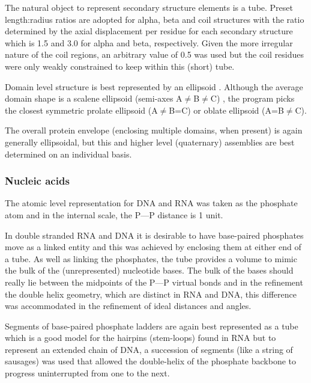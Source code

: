 The natural object to represent secondary structure elements is a tube.   Preset
length:radius ratios are adopted for alpha, beta and coil structures with the ratio
determined by the axial displacement per residue for each secondary structure which
is 1.5 and 3.0 for alpha and beta, respectively.   Given the more irregular nature
of the coil regions, an arbitrary value of 0.5 was used but the coil residues were
only weakly constrained to keep within this (short) tube.

Domain level structure is best represented by an ellipsoid \cite{TaylorWRet83b}.  
Although the average domain shape is a scalene ellipsoid (semi-axes A$\ne$B$\ne$C)
\cite{AszodiAet94a}, the program picks
the closest symmetric prolate ellipsoid (A$\ne$B=C) or oblate ellipsoid (A=B$\ne$C).

The overall protein envelope (enclosing multiple domains, when present) is again generally
ellipsoidal, but this and higher level (quaternary) assemblies are best determined on an individual basis.

\subsubsection{Nucleic acids}

The atomic level representation for DNA and RNA was taken as the phosphate atom
and in the internal scale, the P---P distance is 1 unit.

In double stranded RNA and DNA it is desirable to have base-paired phosphates
move as a linked entity and this was achieved by enclosing them at either end of
a tube.  As well as linking the phosphates, the tube provides a volume to mimic
the bulk of the (unrepresented) nucleotide bases.   The bulk of the bases should
really lie between the midpoints of the P---P virtual bonds and in the refinement the
double helix geometry, which are distinct in RNA and DNA, this difference
was accommodated in the refinement of ideal distances and angles.

Segments of base-paired phosphate ladders are again best represented as a tube
which is a good model for the hairpins (stem-loops) found in RNA but to represent an extended
chain of DNA, a succession of segments (like a string of sausages) was used that allowed the
double-helix of the phosphate backbone to progress uninterrupted from one to the next.
